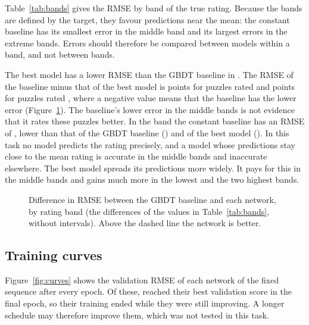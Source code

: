 \documentclass[11pt]{article}
\begin{document}
Table~\ref{tab:bands} gives the RMSE by band of the true rating. Because the
bands are defined by the target, they favour predictions near the mean: the
constant baseline has its smallest error in the middle band and its largest
errors in the extreme bands. Errors should therefore be compared between
models within a band, and not between bands.

\begin{table}[htbp]\centering\small
{}
\caption{Test RMSE by band of the true puzzle rating. The bands are defined
by the target, so values are comparable within a column and not between
columns.}
\label{tab:bands}
\end{table}

The best model has a lower RMSE than the GBDT baseline in
. The RMSE of the baseline minus that of the best
model is  points for puzzles rated
 and  points for puzzles
rated , where a negative value means that the
baseline has the lower error (Figure~\ref{fig:bands}). The baseline's lower
error in the middle bands is not evidence that it rates these puzzles
better. In the band  the constant baseline has an RMSE of
, lower than that of the GBDT baseline ()
and of the best model (). In this task no model predicts the
rating precisely, and a model whose predictions stay close to the mean rating
is accurate in the middle bands and inaccurate elsewhere. The best model
spreads its predictions more widely. It pays for this in the middle bands and
gains much more in the lowest and the two highest bands.

\begin{figure}[htbp]\centering
{}
\caption{Difference in RMSE between the GBDT baseline and each network, by
rating band (the differences of the values in Table~\ref{tab:bands}, without
intervals). Above the dashed line the network is better.}
\label{fig:bands}
\end{figure}

\subsection{Training curves}

Figure~\ref{fig:curves} shows the validation RMSE of each network of the
fixed sequence after every epoch. Of these, 
reached their best validation score in the final epoch, so their training
ended while they were still improving. A longer schedule may therefore
improve them, which was not tested in this task.
\end{document}
